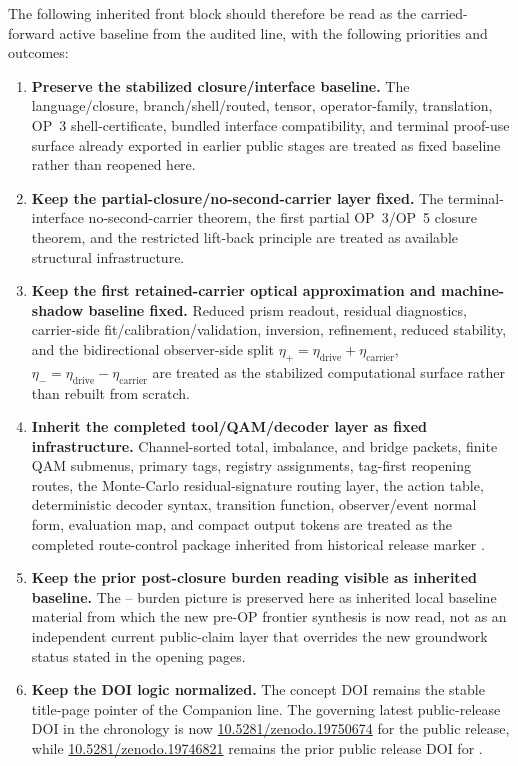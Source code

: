 The following inherited front block should therefore be read as the carried-forward active baseline from the audited  line, with the following priorities and outcomes:
\begin{enumerate}[leftmargin=2em]
 \item \textbf{Preserve the stabilized closure/interface baseline.} The language/closure, branch/shell/routed, tensor, operator-family, translation, OP~3 shell-certificate, bundled interface compatibility, and terminal proof-use surface already exported in earlier public stages are treated as fixed baseline rather than reopened here.
 \item \textbf{Keep the partial-closure/no-second-carrier layer fixed.} The terminal-interface no-second-carrier theorem, the first partial OP~3/OP~5 closure theorem, and the restricted lift-back principle are treated as available structural infrastructure.
 \item \textbf{Keep the first retained-carrier optical approximation and machine-shadow baseline fixed.} Reduced prism readout, residual diagnostics, carrier-side fit/calibration/validation, inversion, refinement, reduced stability, and the bidirectional observer-side split \(\eta_+=\eta_{\mathrm{drive}}+\eta_{\mathrm{carrier}}\), \(\eta_-=\eta_{\mathrm{drive}}-\eta_{\mathrm{carrier}}\) are treated as the stabilized computational surface rather than rebuilt from scratch.
 \item \textbf{Inherit the completed tool/QAM/decoder layer as fixed infrastructure.} Channel-sorted total, imbalance, and bridge packets, finite QAM submenus, primary tags, registry assignments, tag-first reopening routes, the Monte-Carlo residual-signature routing layer, the action table, deterministic decoder syntax, transition function, observer/event normal form, evaluation map, and compact output tokens are treated as the completed route-control package inherited from historical release marker .
 \item \textbf{Keep the prior post-closure burden reading visible as inherited baseline.} The -- burden picture is preserved here as inherited local baseline material from which the new pre-OP frontier synthesis is now read, not as an independent current public-claim layer that overrides the new groundwork status stated in the opening pages.
 \item \textbf{Keep the DOI logic normalized.} The concept DOI remains the stable title-page pointer of the Companion line. The governing latest public-release DOI in the chronology is now \href{https://doi.org/10.5281/zenodo.19750674}{10.5281/zenodo.19750674} for the public  release, while \href{https://doi.org/10.5281/zenodo.19746821}{10.5281/zenodo.19746821} remains the prior public release DOI for .
\end{enumerate}

